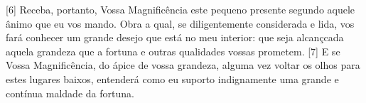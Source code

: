 {[}6{]} Receba, portanto, Vossa Magnificência este pequeno presente
segundo aquele ânimo que eu vos mando. Obra a qual, se diligentemente
considerada e lida, vos fará conhecer um grande desejo que está no meu
interior: que seja alcançcada aquela grandeza que a fortuna e outras
qualidades vossas prometem. {[}7{]} E se Vossa Magnificência, do ápice
de vossa grandeza, alguma vez voltar os olhos para estes lugares baixos,
entenderá como eu suporto indignamente uma grande e contínua maldade da
fortuna.

\setcounter{secnumdepth}{4}


